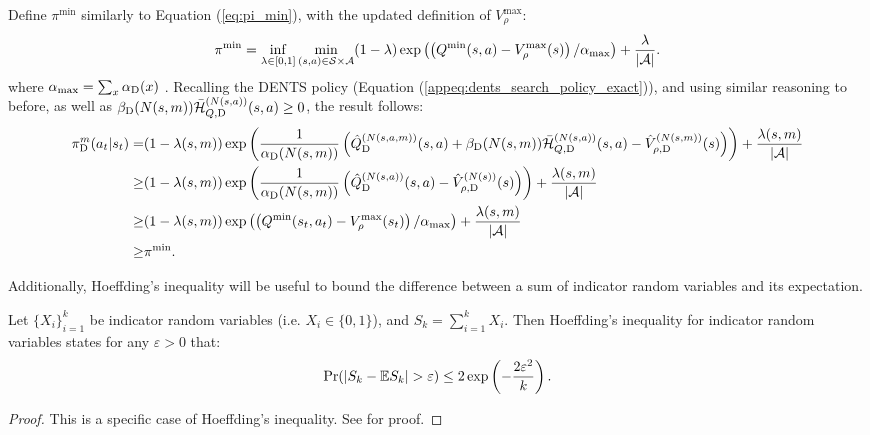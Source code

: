\begin{proofoutline}
        Define $\pi^{\min}$ similarly to Equation (\ref{eq:pi_min}), with the updated definition of $V_\rho^{\max}$: 
        \begin{align}
            \pi^{\min} = \inf_{\lambda\in[0,1]} \min_{(s,a)\in\mathcal{S}\times\mathcal{A}} (1-\lambda) \exp\left(\left(Q^{\min}(s,a)-V_\rho^{\max}(s)\right)/\alpha_{\max}\right) + \frac{\lambda}{|\mathcal{A}|}. \label{eq:pi_min_dents}
        \end{align}
        where $\alpha_{\max}=\sum_x {\alpha_{{\textnormal{D}}}}(x)$ . Recalling the DENTS policy (Equation (\ref{appeq:dents_search_policy_exact})), and using similar reasoning to before, as well as ${\beta_{{\textnormal{D}}}}(N(s,m)){\bar{\mathcal{H}}^{(N(s,a))}_{Q,{\textnormal{D}}}}(s,a) \geq 0$, the result follows:
        \begin{align}
            {\pi^{m}_{{\textnormal{D}}}}(a_t|s_t) 
                =& (1-\lambda(s,m))\exp\left(\frac{1}{{\alpha_{{\textnormal{D}}}}(N(s,m))}
                    \left({\hat{Q}^{(N(s,a,m))}_{{\textnormal{D}}}}(s,a) 
                    + {\beta_{{\textnormal{D}}}}(N(s,m)){\bar{\mathcal{H}}^{(N(s,a))}_{Q,{\textnormal{D}}}}(s,a) 
                    - {\hat{V}^{(N(s,m))}_{\rho,{\textnormal{D}}}}(s) \right)\right) 
                    + \frac{\lambda(s,m)}{|\mathcal{A}|} \\
                \geq& (1-\lambda(s,m))\exp\left(\frac{1}{{\alpha_{{\textnormal{D}}}}(N(s,m))}
                    \left({\hat{Q}^{(N(s,a))}_{{\textnormal{D}}}}(s,a) - {\hat{V}^{(N(s))}_{\rho,{\textnormal{D}}}}(s) \right)\right) 
                    + \frac{\lambda(s,m)}{|\mathcal{A}|} \\
                \geq& (1-\lambda(s,m))\exp\left(\left(Q^{\min}(s_t,a_t)-V_\rho^{\max}(s_t)\right)/\alpha_{\max}\right) 
                    + \frac{\lambda(s,m)}{|\mathcal{A}|} \\
                \geq& \pi^{\min}.
        \end{align}
    \end{proofoutline}








    Additionally, Hoeffding's inequality will be useful to bound the difference between a sum of indicator random variables and its expectation. 
    \begin{theorem} \label{thrm:hoeffding}
        Let $\{X_i\}_{i=1}^k$ be indicator random variables (i.e. $X_i\in\{0,1\}$), and $S_k=\sum_{i=1}^k X_i$. Then Hoeffding's inequality for indicator random variables states for any $\varepsilon > 0$ that:
        \begin{align}
            \Pr(|S_k - \bb{E}S_k|>\varepsilon)\leq 2\exp\left(-\frac{2\varepsilon^2}{k}\right).
        \end{align}
    \end{theorem}
    \begin{proof}
        This is a specific case of Hoeffding's inequality. See  %
        for proof.
    \end{proof}











